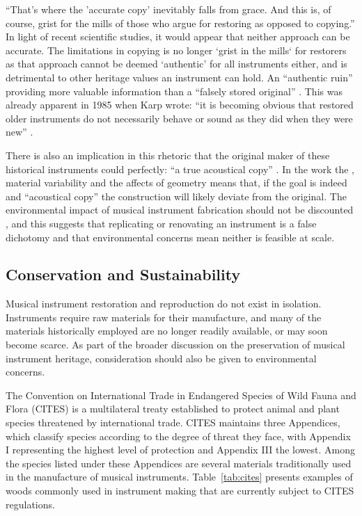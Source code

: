 ``That's where the 'accurate copy' inevitably falls from grace. And this is, of
course, grist for the mills of those who argue for restoring as opposed to
copying.'' In light of recent scientific studies, it would appear that neither
approach can be accurate. The limitations in copying is no longer `grist in the
mills` for restorers as that approach cannot be deemed `authentic' for all
instruments either, and is detrimental to other heritage values an instrument
can hold. An ``authentic ruin'' providing more valuable information than a
``falsely stored original'' \cite[Citing Martin Skowroneck][p
78]{barclay_preservation_2005}. This was already apparent in 1985 when Karp
wrote: ``it is becoming obvious that restored older instruments do not
necessarily behave or sound as they did when they were new''
\cite{karp_musical_1985}.

There is also an implication in this rhetoric that the original maker of these
historical instruments could perfectly: ``a true acoustical copy''
\cite{koster_exact_1994}. In the work the \textcite{viala_simultaneous_2020},
material variability and the affects of geometry means that, if the goal is
indeed and ``acoustical copy'' the construction will likely deviate from the
original. The environmental impact of musical instrument fabrication should not
be discounted \cite{allen_fatto_2012}, and this suggests that replicating or
renovating an instrument is a false dichotomy and that environmental concerns
mean neither is feasible at scale.

\subsection{Conservation and Sustainability}

Musical instrument restoration and reproduction do not exist in isolation.
Instruments require raw materials for their manufacture, and many of the
materials historically employed are no longer readily available, or may soon
become scarce. As part of the broader discussion on the preservation of musical
instrument heritage, consideration should also be given to environmental
concerns.

The Convention on International Trade in Endangered Species of Wild Fauna and
Flora (CITES) is a multilateral treaty established to protect animal and plant
species threatened by international trade. CITES maintains three Appendices,
which classify species according to the degree of threat they face, with
Appendix I representing the highest level of protection and Appendix III the
lowest. Among the species listed under these Appendices are several materials
traditionally used in the manufacture of musical instruments.
Table~\ref{tab:cites} presents examples of woods commonly used in instrument
making that are currently subject to CITES regulations.


